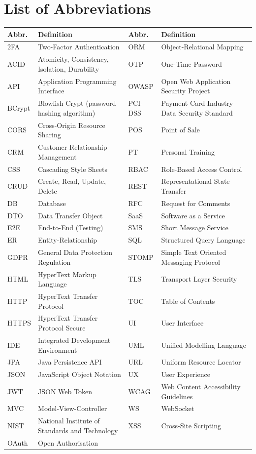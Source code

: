 \documentclass[
  12pt,
  a4paperpaper,
]{report}
\begin{document}
\bigskip

\chapter*{List of Abbreviations}\label{list-of-abbreviations}


\noindent\begin{tabularx}{\textwidth}{@{} p{1.8cm} >{\raggedright\arraybackslash}X @{\hspace{0.5in}} p{1.8cm} >{\raggedright\arraybackslash}X @{}}
\toprule
\textbf{Abbr.} & \textbf{Definition} & \textbf{Abbr.} & \textbf{Definition} \\
\midrule
2FA & Two-Factor Authentication & ORM & Object-Relational Mapping \\
ACID & Atomicity, Consistency, Isolation, Durability & OTP & One-Time Password \\
API & Application Programming Interface & OWASP & Open Web Application Security Project \\
BCrypt & Blowfish Crypt (password hashing algorithm) & PCI-DSS & Payment Card Industry Data Security Standard \\
CORS & Cross-Origin Resource Sharing & POS & Point of Sale \\
CRM & Customer Relationship Management & PT & Personal Training \\
CSS & Cascading Style Sheets & RBAC & Role-Based Access Control \\
CRUD & Create, Read, Update, Delete & REST & Representational State Transfer \\
DB & Database & RFC & Request for Comments \\
DTO & Data Transfer Object & SaaS & Software as a Service \\
E2E & End-to-End (Testing) & SMS & Short Message Service \\
ER & Entity-Relationship & SQL & Structured Query Language \\
GDPR & General Data Protection Regulation & STOMP & Simple Text Oriented Messaging Protocol \\
HTML & HyperText Markup Language & TLS & Transport Layer Security \\
HTTP & HyperText Transfer Protocol & TOC & Table of Contents \\
HTTPS & HyperText Transfer Protocol Secure & UI & User Interface \\
IDE & Integrated Development Environment & UML & Unified Modelling Language \\
JPA & Java Persistence API & URL & Uniform Resource Locator \\
JSON & JavaScript Object Notation & UX & User Experience \\
JWT & JSON Web Token & WCAG & Web Content Accessibility Guidelines \\
MVC & Model-View-Controller & WS & WebSocket \\
NIST & National Institute of Standards and Technology & XSS & Cross-Site Scripting \\
OAuth & Open Authorisation &  &  \\
\bottomrule
\end{tabularx}
\end{document}
